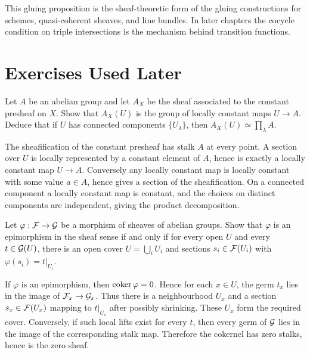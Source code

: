 \begin{remark}
This gluing proposition is the sheaf-theoretic form of the gluing constructions
for schemes, quasi-coherent sheaves, and line bundles.  In later chapters the
cocycle condition on triple intersections is the mechanism behind transition
functions.
\end{remark}

\section{Exercises Used Later}

\begin{exercise}\label{ex:constant-sheaf}
Let \(A\) be an abelian group and let \(A_X\) be the sheaf associated to the
constant presheaf on \(X\).  Show that \(A_X(U)\) is the group of locally
constant maps \(U\to A\).  Deduce that if \(U\) has connected components
\(\{U_\lambda\}\), then \(A_X(U)\simeq\prod_\lambda A\).
\end{exercise}

\begin{solution}
The sheafification of the constant presheaf has stalk \(A\) at every point.  A
section over \(U\) is locally represented by a constant element of \(A\), hence
is exactly a locally constant map \(U\to A\).  Conversely any locally constant
map is locally constant with some value \(a\in A\), hence gives a section of
the sheafification.  On a connected component a locally constant map is
constant, and the choices on distinct components are independent, giving the
product decomposition.
\end{solution}

\begin{exercise}\label{ex:sheaf-surj-local}
Let \(\varphi:\mathcal{F}\to\mathcal{G}\) be a morphism of sheaves of abelian groups.  Show that
\(\varphi\) is an epimorphism in the sheaf sense if and only if for every open
\(U\) and every \(t\in\mathcal{G}(U)\), there is an open cover \(U=\bigcup_i U_i\) and
sections \(s_i\in\mathcal{F}(U_i)\) with \(\varphi(s_i)=t|_{U_i}\).
\end{exercise}

\begin{solution}
If \(\varphi\) is an epimorphism, then \(\operatorname{coker}\varphi=0\).  Hence for each
\(x\in U\), the germ \(t_x\) lies in the image of \(\mathcal{F}_x\to\mathcal{G}_x\).  Thus
there is a neighbourhood \(U_x\) and a section \(s_x\in\mathcal{F}(U_x)\) mapping to
\(t|_{U_x}\) after possibly shrinking.  These \(U_x\) form the required cover.
Conversely, if such local lifts exist for every \(t\), then every germ of
\(\mathcal{G}\) lies in the image of the corresponding stalk map.  Therefore the
cokernel has zero stalks, hence is the zero sheaf.
\end{solution}

